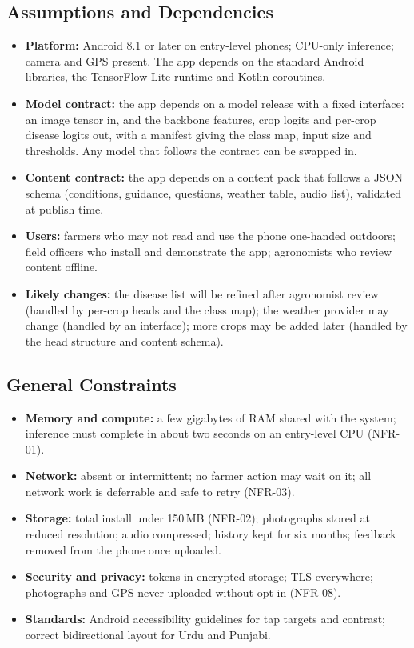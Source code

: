 \subsection{Assumptions and Dependencies}
\begin{itemize}
  \item \textbf{Platform:} Android 8.1 or later on entry-level phones; CPU-only inference; camera and GPS present. The app depends on the standard Android libraries, the TensorFlow Lite runtime and Kotlin coroutines.
  \item \textbf{Model contract:} the app depends on a model release with a fixed interface: an image tensor in, and the backbone features, crop logits and per-crop disease logits out, with a manifest giving the class map, input size and thresholds. Any model that follows the contract can be swapped in.
  \item \textbf{Content contract:} the app depends on a content pack that follows a JSON schema (conditions, guidance, questions, weather table, audio list), validated at publish time.
  \item \textbf{Users:} farmers who may not read and use the phone one-handed outdoors; field officers who install and demonstrate the app; agronomists who review content offline.
  \item \textbf{Likely changes:} the disease list will be refined after agronomist review (handled by per-crop heads and the class map); the weather provider may change (handled by an interface); more crops may be added later (handled by the head structure and content schema).
\end{itemize}

\subsection{General Constraints}
\begin{itemize}
  \item \textbf{Memory and compute:} a few gigabytes of RAM shared with the system; inference must complete in about two seconds on an entry-level CPU (NFR-01).
  \item \textbf{Network:} absent or intermittent; no farmer action may wait on it; all network work is deferrable and safe to retry (NFR-03).
  \item \textbf{Storage:} total install under 150\,MB (NFR-02); photographs stored at reduced resolution; audio compressed; history kept for six months; feedback removed from the phone once uploaded.
  \item \textbf{Security and privacy:} tokens in encrypted storage; TLS everywhere; photographs and GPS never uploaded without opt-in (NFR-08).
  \item \textbf{Standards:} Android accessibility guidelines for tap targets and contrast; correct bidirectional layout for Urdu and Punjabi.
\end{itemize}

